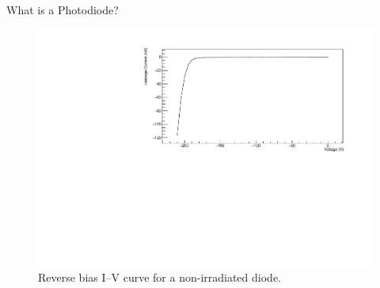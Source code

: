 \documentclass{beamer}
\begin{document}
    \begin{frame}{What is a Photodiode?}
        \begin{figure}
            \centering
            \includegraphics[width=0.9\linewidth]{Diode39_IV_2602.pdf}
            \caption{Reverse bias I--V curve for a non-irradiated diode.}
            \label{fig:Diode39IV}
        \end{figure}  
    \end{frame}
    
\end{document}
